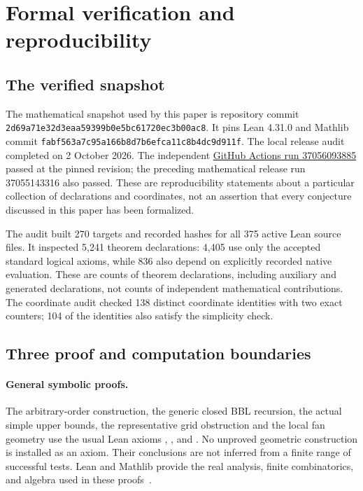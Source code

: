 \section{Formal verification and reproducibility}\label{sec:formalization}

\subsection{The verified snapshot}

The mathematical snapshot used by this paper is repository commit
\nolinkurl{2d69a71e32d3eaa59399b0e5bc61720ec3b00ac8}. It pins Lean 4.31.0 and Mathlib commit
\nolinkurl{fabf563a7c95a166b8d7b6efca11c8b4dc9d911f}. The local release audit completed on 2 October 2026. The independent \href{https://github.com/alejandrozu/kobon-proof/actions/runs/37056093885}{GitHub Actions run 37056093885} passed at the pinned revision; the preceding mathematical release run 37055143316 also passed. These are reproducibility statements about a particular collection of declarations and coordinates, not an assertion that every conjecture discussed in this paper has been formalized.

The audit built 270 targets and recorded hashes for all 375 active Lean source files. It inspected 5,241 theorem declarations: 4,405 use only the accepted standard logical axioms, while 836 also depend on explicitly recorded native evaluation. These are counts of theorem declarations, including auxiliary and generated declarations, not counts of independent mathematical contributions. The coordinate audit checked 138 distinct coordinate identities with two exact counters; 104 of the identities also satisfy the simplicity check.

\subsection{Three proof and computation boundaries}

\paragraph{General symbolic proofs.}
The arbitrary-order construction, the generic closed BBL recursion, the actual simple upper bounds, the representative grid obstruction and the local fan geometry use the usual Lean axioms , , and . No unproved geometric construction is installed as an axiom. Their conclusions are not inferred from a finite range of successful tests. Lean and Mathlib provide the real analysis, finite combinatorics, and algebra used in these proofs~\cite{lean4,mathlib}.

